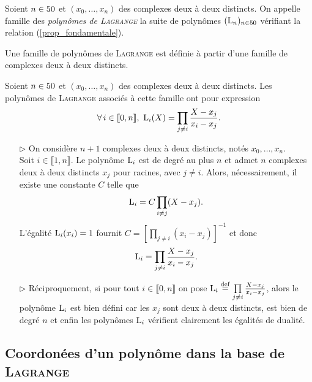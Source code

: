 \begin{defi}
    Soient $n \in 50$ et $(x_0, \dots, x_n)$ des complexes deux à deux distincts. On appelle famille des \emph{polynômes de \textsc{Lagrange}} la suite de polynômes $(\mathrm{L}_n)_{n \in 50}$ vérifiant la relation (\ref{prop_fondamentale}).
\end{defi}

\begin{remarque}
    Une famille de polynômes de \textsc{Lagrange} est définie à partir d'une famille de complexes deux à deux distincts. 
\end{remarque}

\begin{prop}
    Soient $n \in 50$ et $(x_0, \dots, x_n)$ des complexes deux à deux distincts. Les polynômes de \textsc{Lagrange} associés à cette famille ont pour expression
    $$\forall i \in \llbracket 0, n \rrbracket,\ \Lag_i(X) = \prod_{j \neq i} \frac{X-x_j}{x_i - x_j}.$$
\end{prop}

\begin{demo}
    \begin{itemize}
        \item[$\rhd$] On considère $n + 1$ complexes deux à deux distincts, notés $x_0, \dots, x_n$. \\
        Soit $i \in \llbracket 1, n \rrbracket$. Le polynôme $\mathrm{L}_i$ est de degré au plus $n$ et admet $n$ complexes deux à deux distincts $x_j$ pour racines, avec $j \not= i$. Alors, nécessairement, il existe une constante $C$ telle que 
        $$\mathrm{L}_i = C \prod_{i \not= j} (X-x_j).$$
        L'égalité $\mathrm{L}_i(x_i) = 1$ fournit $C = \left[ \prod\limits_{j \not=i}(x_i - x_j) \right]^{-1}$ et donc 
        $$\mathrm{L}_i = \prod_{j \neq i} \frac{X-x_j}{x_i - x_j}.$$
        \item[$\rhd$] Réciproquement, si pour tout $i \in \llbracket 0, n\rrbracket$ on pose $\mathrm{L}_i \overset{\mathrm{\tiny def}}{=} \prod\limits_{j \neq i} \frac{X-x_j}{x_i - x_j}$, alors le polynôme $\mathrm{L}_i$ est bien défini car les $x_j$ sont deux à deux distincts, est bien de degré $n$ et enfin les polynômes $\mathrm{L}_i$ vérifient clairement les égalités de dualité.
    \end{itemize}
\end{demo}

\subsection{Coordonées d'un polynôme dans la base de \textsc{Lagrange}}

